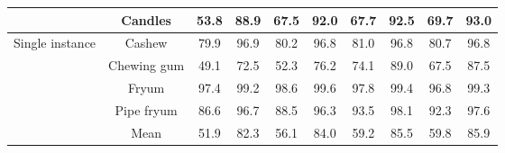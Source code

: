 \documentclass[runningheads]{llncs}
\begin{document}
\begin{table*}[!ht]
{\begin{tabular}{cc|cccc|cccc}
    \multicolumn{1}{c|}{}                                    & Candles     & 53.8  & 88.9                        & 67.5        & 92.0        & 67.7  & 92.5                        & 69.7       & 93.0        \\ \hline
    \multicolumn{1}{c|}{\multirow{4}{*}{Single instance}}    & Cashew      & 79.9  & 96.9                        & 80.2        & 96.8        & 81.0  & 96.8                        & 80.7       & 96.8        \\
    \multicolumn{1}{c|}{}                                    & Chewing gum & 49.1  & 72.5                        & 52.3        & 76.2        & 74.1  & 89.0                        & 67.5       & 87.5        \\
    \multicolumn{1}{c|}{}                                    & Fryum       & 97.4  & 99.2                        & 98.6        & 99.6        & 97.8  & 99.4                        & 96.8       & 99.3        \\
    \multicolumn{1}{c|}{}                                    & Pipe fryum  & 86.6  & 96.7                        & 88.5        & 96.3        & 93.5  & 98.1                        & 92.3       & 97.6        \\ \hline
    \multicolumn{1}{c|}{}                                    & Mean        &  51.9 & 82.3 & 56.1 & 84.0 & 59.2 & 85.5 & 59.8 & 85.9            \\ \hline
    \end{tabular}}
\end{table*}
\end{document}
